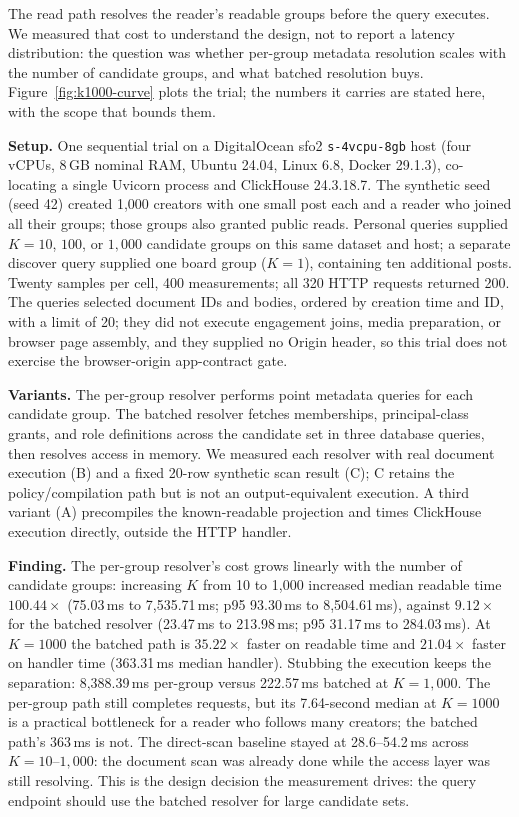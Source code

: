 \documentclass[sigconf, nonacm]{acmart}
\begin{document}
The read path resolves the reader's readable groups before the query
executes. We measured that cost to understand the design, not to report
a latency distribution: the question was whether per-group metadata
resolution scales with the number of candidate groups, and what batched
resolution buys. Figure~\ref{fig:k1000-curve} plots the trial; the
numbers it carries are stated here, with the scope that bounds them.

\textbf{Setup.} One sequential trial on a DigitalOcean sfo2
\texttt{s-4vcpu-8gb} host (four vCPUs, 8\,GB nominal RAM, Ubuntu 24.04,
Linux 6.8, Docker 29.1.3), co-locating a single Uvicorn process and
ClickHouse 24.3.18.7. The synthetic seed (seed 42) created 1,000
creators with one small post each and a reader who joined all their
groups; those groups also granted public reads. Personal queries supplied
$K=10$, $100$, or $1{,}000$ candidate groups on this same dataset and
host; a separate discover query supplied one board group ($K=1$),
containing ten additional posts. Twenty samples per cell, 400
measurements; all 320 HTTP requests returned 200. The queries selected
document IDs and bodies, ordered by creation time and ID, with a limit of
20; they did not execute engagement joins, media preparation, or browser
page assembly, and they supplied no Origin header, so this trial does not
exercise the browser-origin app-contract gate.

\textbf{Variants.} The per-group resolver performs point metadata queries
for each candidate group. The batched resolver fetches memberships,
principal-class grants, and role definitions across the candidate set in
three database queries, then resolves access in memory. We measured each
resolver with real document execution (B) and a fixed 20-row synthetic
scan result (C); C retains the policy/compilation path but is not an
output-equivalent execution. A third variant (A) precompiles the
known-readable projection and times ClickHouse execution directly,
outside the HTTP handler.

\textbf{Finding.} The per-group resolver's cost grows linearly with the
number of candidate groups: increasing $K$ from 10 to 1,000 increased
median readable time $100.44\times$ (75.03\,ms to 7,535.71\,ms; p95
93.30\,ms to 8,504.61\,ms), against $9.12\times$ for the batched
resolver (23.47\,ms to 213.98\,ms; p95 31.17\,ms to 284.03\,ms). At
$K=1000$ the batched path is $35.22\times$ faster on readable time and
$21.04\times$ faster on handler time (363.31\,ms median handler). Stubbing
the execution keeps the separation: 8,388.39\,ms per-group versus
222.57\,ms batched at $K=1{,}000$. The per-group path still completes
requests, but its 7.64-second median at $K=1000$ is a practical
bottleneck for a reader who follows many creators; the batched path's
363\,ms is not. The direct-scan baseline stayed at 28.6--54.2\,ms across
$K = 10$--$1{,}000$: the document scan was already done while the access
layer was still resolving. This is the design decision the measurement
drives: the query endpoint should use the batched resolver for large
candidate sets.
\end{document}
